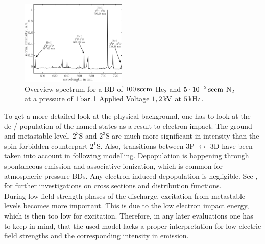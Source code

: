 \documentclass[a4paper,10pt,twoside]{article}
\newcommand{\tenpo}[1]{ 10^{#1}}
\begin{document}
				\begin{figure}[t]
					\centering
					\includegraphics[width=0.45\textwidth]{figures/results/int_spectrum}
					\caption{Overview spectrum for a BD of $\unit[100]{sccm}$ He$_2$ and $\unit[5\cdot\tenpo{-2}]{sccm}$ N$_2$ at a pressure of $\unit[1]{bar}$.1 Applied Voltage $\unit[1,2]{kV}$ at $\unit[5]{kHz}$.}
					\label{img:intspec}
				\end{figure}
			
			To get a more detailed look at the physical background, one has to look at the de-/ population of the named states as a result to electron impact. The ground and metastable level, $2^3$S and $2^3$S are much more significant in intensity than the spin forbidden counterpart $2^1$S. Also, transitions between 3P $\leftrightarrow$ 3D have been taken into account in following modelling. Depopulation is happening through spontaneous emission and associative ionization, which is common for atmospheric pressure BDs. Any electron induced depopulation is negligible. See \cite{PhysRevA.21.188}, \cite{0963-0252-14-4-011} for further investigations on cross sections and distribution functions.\\
			During low field strength phases of the discharge, excitation from metastable levels becomes more important. This is due to the low electron impact energy, which is then too low for excitation. Therefore, in any later evaluations one has to keep in mind, that the used model lacks a proper interpretation for low electric field strengths and the corresponding intensity in emission.
			
			
		
\end{document}
